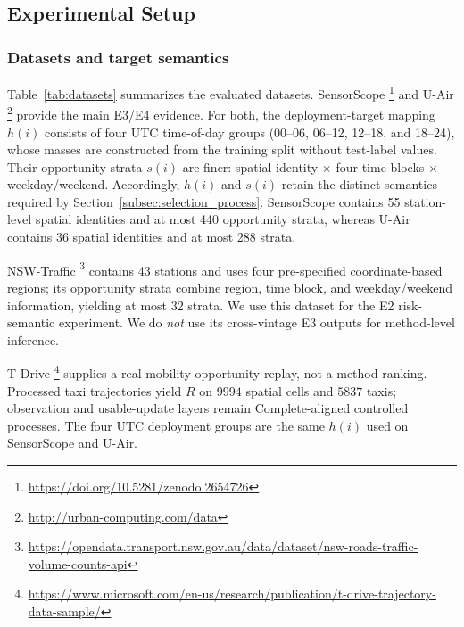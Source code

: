 \documentclass[letterpaper,journal]{IEEEtran}
\begin{document}
\subsection{Experimental Setup}
\label{subsec:eval_setup}

\subsubsection{Datasets and target semantics}

Table~\ref{tab:datasets} summarizes the evaluated datasets.  SensorScope
\cite{ingelrest2010sensorscope,barrenetxea2019sensorscope}\footnote{\url{https://doi.org/10.5281/zenodo.2654726}}
and U-Air
\cite{zheng2013uair}\footnote{\url{http://urban-computing.com/data}}
provide the main E3/E4 evidence.  For both, the deployment-target mapping
$h(i)$ consists of four UTC time-of-day groups
(00--06, 06--12, 12--18, and 18--24), whose masses are constructed from the training
split without test-label values.  Their opportunity strata $s(i)$ are finer:
spatial identity $\times$ four time blocks $\times$ weekday/weekend.
Accordingly, $h(i)$ and $s(i)$ retain the distinct semantics required by
Section~\ref{subsec:selection_process}.  SensorScope contains 55 station-level
spatial identities and at most 440 opportunity strata, whereas U-Air contains
36 spatial identities and at most 288 strata.

NSW-Traffic
\cite{tfnsw2024traffic}\footnote{\url{https://opendata.transport.nsw.gov.au/data/dataset/nsw-roads-traffic-volume-counts-api}}
contains 43 stations and uses four pre-specified coordinate-based regions;
its opportunity strata combine region, time block, and weekday/weekend
information, yielding at most 32 strata.  We use this dataset for the E2
risk-semantic experiment.  We do \emph{not} use its cross-vintage E3 outputs for
method-level inference.

T-Drive
\cite{yuan2010tdrive}\footnote{\url{https://www.microsoft.com/en-us/research/publication/t-drive-trajectory-data-sample/}}
supplies a real-mobility opportunity replay, not a
method ranking.  Processed taxi trajectories yield $R$ on $9994$
spatial cells and $5837$ taxis; observation and usable-update layers
remain Complete-aligned controlled processes.  The four UTC deployment
groups are the same $h(i)$ used on SensorScope and U-Air.
\end{document}
